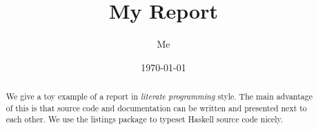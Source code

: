 \documentclass[12pt,a4paper]{article}
\title{My Report}
\author{Me}
\date{\today}
\begin{document}
\maketitle

\begin{abstract}
We give a toy example of a report in \emph{literate programming} style.
The main advantage of this is that source code and documentation can
be written and presented next to each other.
We use the listings package to typeset Haskell source code nicely.
\end{abstract}

\vfill

\tableofcontents

\clearpage














\end{document}
